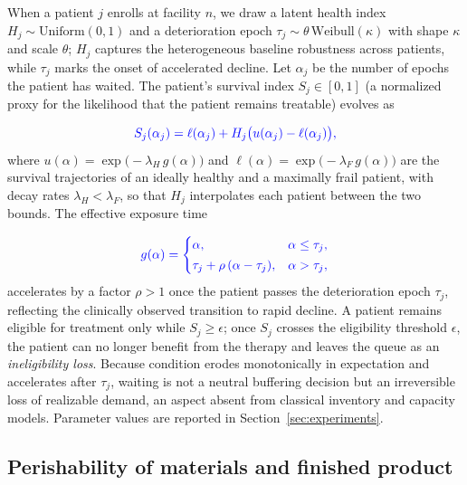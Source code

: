 \documentclass[preprint,review,12pt,nonatbib]{elsarticle}
\providecommand{\DIFadd}[1]{{\protect\color{blue}#1}} %
\begin{document}
\DIFadd{When a patient $j$ enrolls at facility $n$, we draw a latent health index $H_j \sim \mathrm{Uniform}(0,1)$ and a deterioration epoch $\tau_j \sim \theta\,\mathrm{Weibull}(\kappa)$ with shape $\kappa$ and scale $\theta$; $H_j$ captures the heterogeneous baseline robustness across patients, while $\tau_j$ marks the onset of accelerated decline. Let $\alpha_j$ be the number of epochs the patient has waited. The patient's survival index $S_j \in [0,1]$ (a normalized proxy for the likelihood that the patient remains treatable) evolves as
}

\begin{equation}
\DIFadd{\label{eq:survival}
S_j(\alpha_j) = \ell(\alpha_j) + H_j\big(u(\alpha_j) - \ell(\alpha_j)\big),
}\end{equation}
\DIFadd{where $u(\alpha)=\exp\!\big(-\lambda_H\,g(\alpha)\big)$ and $\ell(\alpha)=\exp\!\big(-\lambda_F\,g(\alpha)\big)$ are the survival trajectories of an ideally healthy and a maximally frail patient, with decay rates $\lambda_H < \lambda_F$, so that $H_j$ interpolates each patient between the two bounds. The effective exposure time
}

\begin{equation}
\DIFadd{\label{eq:effective-time}
g(\alpha) =
\begin{cases}
\alpha, & \alpha \le \tau_j,\\[2pt]
\tau_j + \rho\,(\alpha - \tau_j), & \alpha > \tau_j,
\end{cases}
}\end{equation}
\DIFadd{accelerates by a factor $\rho > 1$ once the patient passes the deterioration epoch $\tau_j$, reflecting the clinically observed transition to rapid decline. A patient remains eligible for treatment only while $S_j \ge \epsilon$; once $S_j$ crosses the eligibility threshold $\epsilon$, the patient can no longer benefit from the therapy and leaves the queue as an }\emph{\DIFadd{ineligibility loss}}\DIFadd{. Because condition erodes monotonically in expectation and accelerates after $\tau_j$, waiting is not a neutral buffering decision but an irreversible loss of realizable demand, an aspect absent from classical inventory and capacity models. Parameter values are reported in Section~\ref{sec:experiments}.
}

\subsection{\DIFadd{Perishability of materials and finished product}}
\label{sec:problem-expiry}
\end{document}
